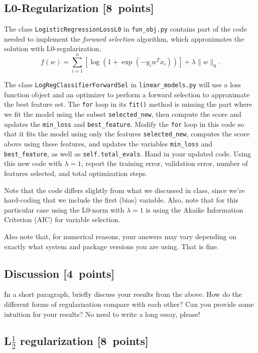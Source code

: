 \documentclass{article}
\newcommand{\blu}[1]{{\textcolor{blu}{#1}}}
\let\ask\blu
\newcommand\pts[1]{\textcolor{pointscolour}{[#1~points]}}
\newcommand{\norm}[1]{\lVert #1 \rVert}
\begin{document}
\subsection{L0-Regularization \pts{8}}

The class \verb|LogisticRegressionLossL0| in \verb|fun_obj.py| contains part of the code needed to implement the \emph{forward selection} algorithm,
which approximates the solution with L0-regularization,
\[
f(w) =  \sum_{i=1}^n \left[\log(1+\exp(-y_iw^Tx_i))\right] + \lambda\norm{w}_0.
\]

The class \verb|LogRegClassifierForwardSel| in \verb|linear_models.py| will use a loss function object and an optimizer to perform a forward selection to approximate the best feature set.
The \verb|for| loop in its \verb|fit()| method is missing the part where we fit the model using the subset \verb|selected_new|,
then compute the score and updates the \verb|min_loss| and \verb|best_feature|.
Modify the \verb|for| loop in this code so that it fits the model using only
the features \verb|selected_new|, computes the score above using these features,
and updates the variables \verb|min_loss| and \verb|best_feature|,
as well as \verb|self.total_evals|.
\ask{Hand in your updated code. Using this new code with $\lambda=1$,
report the training error, validation error, number of features selected, and total optimization steps.}

Note that the code differs slightly from what we discussed in class,
since we're hard-coding that we include the first (bias) variable.
Also, note that for this particular case using the L0-norm with $\lambda=1$
is using the Akaike Information Criterion (AIC) for variable selection.

Also note that, for numerical reasons, your answers may vary depending on exactly what system and package versions you are using. That is fine.


\subsection{Discussion \pts{4}}

In a short paragraph, briefly discuss your results from the above. How do the
different forms of regularization compare with each other?
Can you provide some intuition for your results? No need to write a long essay, please!



\subsection{L$\frac12$ regularization \pts{8}}
\end{document}
